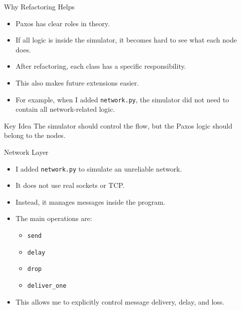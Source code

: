 \documentclass[aspectratio=169]{beamer}
\begin{document}
\begin{frame}{Why Refactoring Helps}
  \begin{itemize}
    \item Paxos has clear roles in theory.
    \item If all logic is inside the simulator, it becomes hard to see what each node does.
    \item After refactoring, each class has a specific responsibility.
    \item This also makes future extensions easier.
    \item For example, when I added \texttt{network.py}, the simulator did not need to contain all network-related logic.
  \end{itemize}

  \begin{block}{Key Idea}
    The simulator should control the flow, but the Paxos logic should belong to the nodes.
  \end{block}
\end{frame}

\begin{frame}{Network Layer}
  \begin{itemize}
    \item I added \texttt{network.py} to simulate an unreliable network.
    \item It does not use real sockets or TCP.
    \item Instead, it manages messages inside the program.
    \item The main operations are:
    \begin{itemize}
      \item \texttt{send}
      \item \texttt{delay}
      \item \texttt{drop}
      \item \texttt{deliver\_one}
    \end{itemize}
    \item This allows me to explicitly control message delivery, delay, and loss.
  \end{itemize}
\end{frame}
\end{document}
